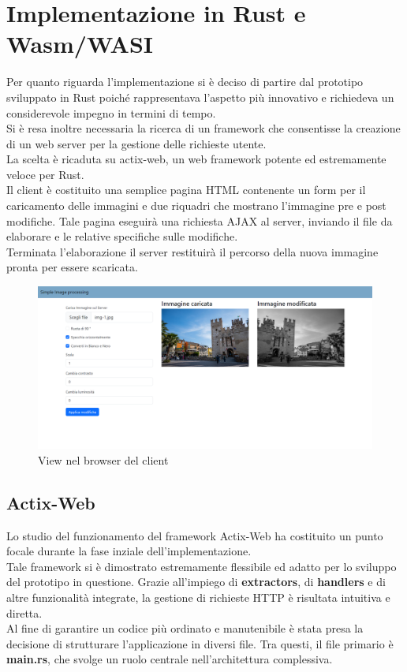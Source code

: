 \section{Implementazione in Rust e Wasm/WASI}
Per quanto riguarda l'implementazione si è deciso di partire dal prototipo sviluppato in Rust poiché rappresentava l'aspetto più innovativo e richiedeva un considerevole impegno in termini di tempo.
\\Si è resa inoltre necessaria la ricerca di un framework che consentisse la creazione di un web server per la gestione delle richieste utente.
\\La scelta è ricaduta su actix-web, un web framework potente ed estremamente veloce per Rust.
\\Il client è costituito una semplice pagina HTML contenente un form per il caricamento delle immagini e due riquadri che mostrano l'immagine pre e post modifiche.
Tale pagina eseguirà una richiesta AJAX al server, inviando il file da elaborare e le relative specifiche sulle modifiche.
\\Terminata l'elaborazione il server restituirà il percorso della nuova immagine pronta per essere scaricata.
\begin{figure}
    \begin{center}
            \includegraphics[width=1\columnwidth]{images/client.png}
    \end{center}
    \caption{View nel browser del client}
    \label{fig:client}
\end{figure}
\subsection{Actix-Web}
Lo studio del funzionamento del framework Actix-Web ha costituito un punto focale durante la fase inziale dell'implementazione.
\\Tale framework si è dimostrato estremamente flessibile ed adatto per lo sviluppo del prototipo in questione.
Grazie all'impiego di \textbf{extractors}, di \textbf{handlers} e di altre funzionalità integrate, la gestione di richieste HTTP è risultata intuitiva e diretta.
\\Al fine di garantire un codice più ordinato e manutenibile è stata presa la decisione di strutturare l'applicazione in diversi file.
Tra questi, il file primario è \textbf{main.rs}, che svolge un ruolo centrale nell'architettura complessiva.
